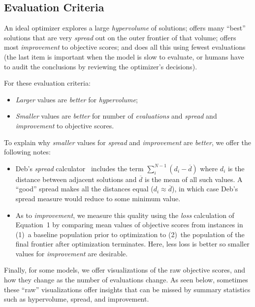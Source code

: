 \documentclass[10pt,journal,compsoc]{IEEEtran}
\newcommand{\bi}{\begin{itemize}}
\newcommand{\ei}{\end{itemize}}
\newenvironment{changed}{\par}{\par}
\begin{document}
\begin{changed}
\subsection{Evaluation Criteria}\label{sec:eval}
An ideal optimizer explores a  large {\em
  hypervolume} of solutions;  offers many  ``best''
solutions that are very {\em spread} out on the outer
frontier of that volume; 
offers most {\em improvement} to objective scores; and does all this
using fewest evaluations (the last item is  important when the model is slow to evaluate, or
humans have to audit the conclusions by reviewing the
optimizer's decisions).

For these evaluation criteria:
\bi
\item
{\em Larger} values are {\em better}  for {\em hypervolume};
\item 
{\em Smaller} values are {\em better}  for number of {\em evaluations} and {\em spread} and {\em improvement} to objective scores.
\ei
To explain why {\em smaller} values for {\em spread} and {\em improvement} are {\em better},
we offer the following notes:
\bi
\item
Deb's {\em spread} calculator~\cite{deb00afast} includes
the term 
$\sum_i^{N-1} (d_i - \overline{d})$ 
where $d_i$
is the distance between adjacent solutions and
$\overline{d}$ is the mean of all such values.  A
``good'' spread makes all the distances equal ($d_i
\approx \overline{d}$), in which case Deb's spread
measure would reduce to some minimum value.
\item
As to {\em improvement}, we measure this quality using the {\em loss} calculation
of Equation~1 
by  comparing mean values of objective scores from instances in (1)~a baseline population prior to optimization
to (2)~the population of the final frontier after optimization terminates.
Here, 
less loss is better so smaller values for {\em improvement} are desirable. 
\ei
Finally, for some models, we offer visualizations of the raw objective scores, and how they change
as the number of evaluations change. As seen below, sometimes these ``raw'' visualizations
offer insights that can be missed by summary statistics such as hypervolume, spread, and improvement. 
\end{changed}
\end{document}
